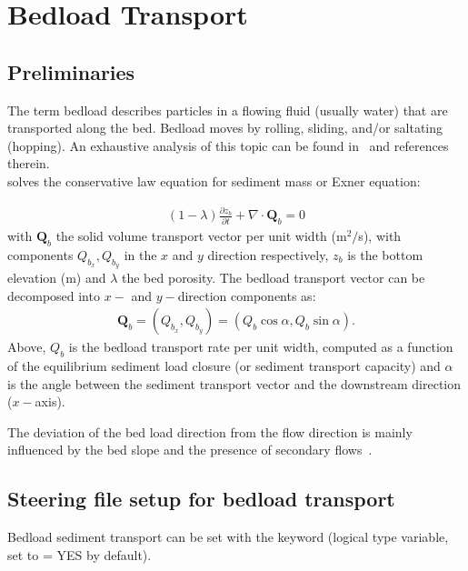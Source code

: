 \chapter[Bedload sediment transport]{Bedload Transport}\label{sec:BedloadTransport}

\section{Preliminaries}
The term bedload describes particles in a flowing fluid (usually water) that are transported along the bed. Bedload moves by rolling, sliding, and/or saltating (hopping). An exhaustive analysis of this topic can be found in~\cite{GarciaBook2006} and references therein.\\

\sisyphe{} solves the conservative law equation for sediment mass or Exner equation:

\begin{align}
(1-\lambda)\frac{\partial z_b}{\partial t} + \nabla\cdot \mathbf Q_b = 0
\label{eq:Exner}
\end{align}
with $\mathbf Q_b$ the solid volume transport vector per unit width (m$^2/$s), with components $Q_{b_x}, Q_{b_y}$ in the $x$ and $y$ direction respectively, $z_b$ is the bottom elevation (m) and $\lambda$ the bed porosity. The bedload transport vector can be decomposed into $x-$ and $y-$direction components as:
\begin{align}
\mathbf Q_b = (Q_{b_x}, Q_{b_y}) = (Q_b \cos\alpha, Q_b \sin\alpha).
\label{eq:bedloadtransportvector}
\end{align}
Above, $Q_b$ is the bedload transport rate per unit width, computed as a function of the equilibrium sediment load closure (or sediment transport capacity) and $\alpha$ is the angle between the sediment transport vector and the downstream direction ($x-$axis).

The deviation of the bed load direction from the flow direction is mainly influenced by the bed slope and the presence of secondary flows~\cite{Talmon95}.

\section{Steering file setup for bedload transport}
Bedload sediment transport can be set with the keyword  (logical type variable, set to {\ttfamily = YES} by default).

